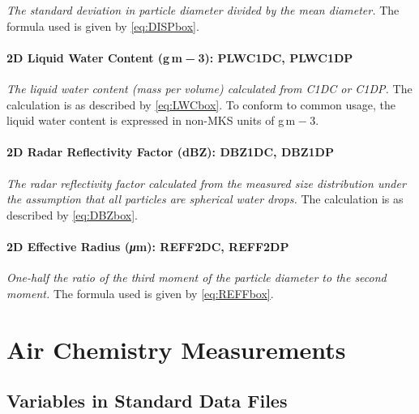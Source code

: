 \documentclass[
]{book}
\begin{document}
\emph{The standard deviation in particle diameter divided by the mean diameter.} The formula used is given by \eqref{eq:DISPbox}.

\hypertarget{lwc2d}{%
\subsubsection*{\texorpdfstring{2D Liquid Water Content (g m{ − 3}): PLWC1DC, PLWC1DP}{2D Liquid Water Content (g m − 3): PLWC1DC, PLWC1DP}}\label{lwc2d}}

\emph{The liquid water content (mass per volume) calculated from C1DC or C1DP.} The calculation is as described by \eqref{eq:LWCbox}. To conform to common usage, the liquid water content is expressed in non-MKS units of g m{ − 3}.

\hypertarget{dbz2d}{%
\subsubsection*{2D Radar Reflectivity Factor (dBZ): DBZ1DC, DBZ1DP}\label{dbz2d}}

\emph{The radar reflectivity factor calculated from the measured size distribution under the assumption that all particles are spherical water drops.} The calculation is as described by \eqref{eq:DBZbox}.

\hypertarget{reff2d}{%
\subsubsection*{\texorpdfstring{2D Effective Radius ({\emph{μ}}m): REFF2DC, REFF2DP}{2D Effective Radius (μm): REFF2DC, REFF2DP}}\label{reff2d}}

\emph{One-half the ratio of the third moment of the particle diameter to the second moment.} The formula used is given by \eqref{eq:REFFbox}.

\hypertarget{air-chemistry-measurements}{%
\chapter{Air Chemistry Measurements}\label{air-chemistry-measurements}}

\hypertarget{variables-in-standard-data-files}{%
\section{Variables in Standard Data Files}\label{variables-in-standard-data-files}}
\end{document}

